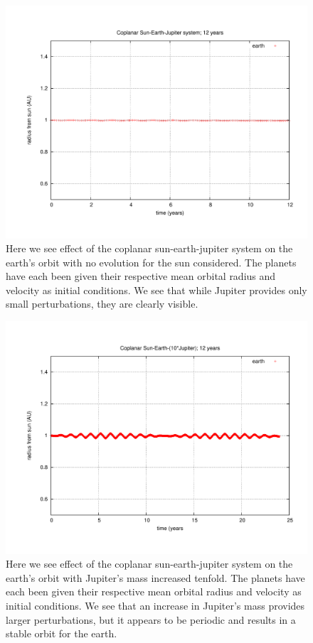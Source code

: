 \documentclass[11pt,a4paper]{article}
\begin{document}
\begin{figure}
\centering
\includegraphics[width=1.0\textwidth]{coplanar_sej1_radius.pdf}
\caption{Here we see effect of the coplanar sun-earth-jupiter system on the earth's orbit with no evolution for the sun considered. The planets have each been given their respective mean orbital radius and velocity as initial conditions. We see that while Jupiter provides only small perturbations, they are clearly visible.}
\end{figure}
\begin{figure}
\centering
\includegraphics[width=1.0\textwidth]{coplanar_sej10_radius.pdf}
\caption{Here we see effect of the coplanar sun-earth-jupiter system on the earth's orbit with Jupiter's mass increased tenfold. The planets have each been given their respective mean orbital radius and velocity as initial conditions. We see that an increase in Jupiter's mass provides larger perturbations, but it appears to be periodic and results in a stable orbit for the earth.}
\end{figure}
\end{document}
